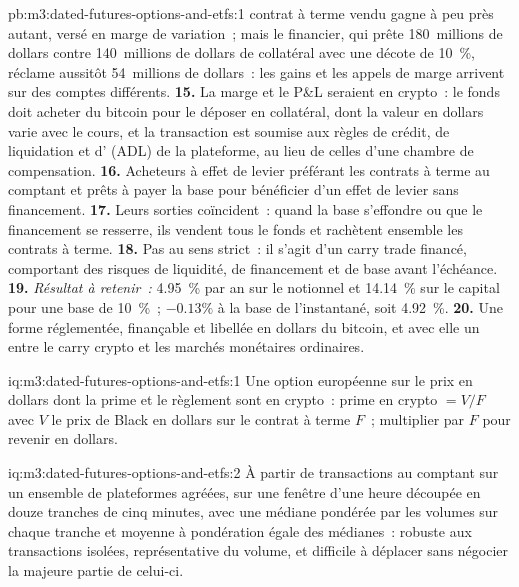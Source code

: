 \begin{solution}{pb:m3:dated-futures-options-and-etfs:1}
contrat à terme vendu gagne à peu près autant, versé en marge de variation~; mais le financier, qui prête 180~millions de dollars contre 140~millions de dollars de
collatéral avec une décote de 10~\%, réclame aussitôt 54~millions de dollars~: les gains et les appels de marge arrivent sur des comptes différents. \textbf{15.}
La marge et le P\&L seraient en crypto~: le fonds doit acheter du bitcoin pour le déposer en collatéral, dont la valeur en dollars varie avec le cours, et la transaction
est soumise aux règles de crédit, de liquidation et d' (ADL) de la plateforme, au lieu de celles d'une chambre de compensation. \textbf{16.} Acheteurs à effet de levier préférant les contrats à terme au comptant et prêts à
payer la base pour bénéficier d'un effet de levier sans financement. \textbf{17.} Leurs sorties coïncident~: quand la base s'effondre ou que le financement se resserre, ils
vendent tous le fonds et rachètent ensemble les contrats à terme. \textbf{18.} Pas au sens strict~: il s'agit d'un carry trade financé, comportant des risques de liquidité, de financement et
de base avant l'échéance. \textbf{19.} \emph{Résultat à retenir~:} 4.95~\% par an sur le notionnel et 14.14~\% sur le capital pour une base de 10~\%~; $-0.13\%$
à la base de l'instantané, soit 4.92~\%. \textbf{20.} Une forme réglementée, finançable et libellée en dollars du bitcoin, et avec elle un  entre le carry crypto
et les marchés monétaires ordinaires.
\end{solution}

\begin{solution}{iq:m3:dated-futures-options-and-etfs:1}
Une option européenne sur le prix en dollars dont la prime et le règlement sont en crypto~: prime en crypto $= V/F$ avec $V$ le prix
de Black en dollars sur le contrat à terme $F$~; multiplier par $F$ pour revenir en dollars.
\end{solution}

\begin{solution}{iq:m3:dated-futures-options-and-etfs:2}
À partir de transactions au comptant sur un ensemble de plateformes agréées, sur une fenêtre d'une heure découpée en douze tranches de cinq minutes, avec une
médiane pondérée par les volumes sur chaque tranche et moyenne à pondération égale des médianes~: robuste aux transactions isolées, représentative du
volume, et difficile à déplacer sans négocier la majeure partie de celui-ci.
\end{solution}

